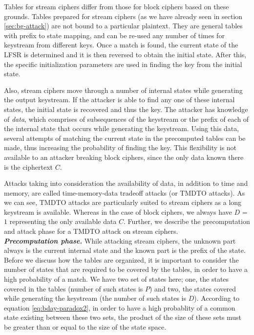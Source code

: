 Tables for stream ciphers differ from those for block ciphers based on these grounds. Tables prepared for stream ciphers (as we have already seen in section \ref{sec:bg-attack}) are not bound to a particular plaintext. They are general tables with prefix to state mapping, and can be re-used any number of times for keystream from different keys. Once a match is found, the current state of the LFSR is determined and it is then reversed to obtain the initial state. After this, the specific initialization parameters are used in finding the key from the initial state.

Also, stream ciphers move through a number of internal states while generating the output keystream. If the attacker is able to find any one of these internal states, the initial state is recovered and thus the key. The attacker has knowledge of \emph{data}, which comprises of subsequences of the keystream or the prefix of each of the internal state that occurs while generating the keystream. Using this data, several attempts of matching the current state in the precomputed tables can be made, thus increasing the probability of finding the key. This flexibility is not available to an attacker breaking block ciphers, since the only data known there is the ciphertext $C$. 

Attacks taking into consideration the availability of data, in addition to time and memory, are called time-memory-data tradeoff attacks (or TMDTO attacks). As we can see, TMDTO attacks are particularly suited to stream ciphers as a long keystream is available. Whereas in the case of block ciphers, we always have $D$ = $1$ representing the only available data $C$. Further, we describe the precomputation and attack phase for a TMDTO attack on stream ciphers.\\

\noindent \textit{\textbf{Precomputation phase.}} While attacking stream ciphers, the unknown part always is the current internal state and the known part is the prefix of the state. Before we discuss how the tables are organized, it is important to consider the number of states that are required to be covered by the tables, in order to have a high probability of a match. We have two set of states here; one, the states covered in the tables (number of such states is $P$) and two, the states covered while generating the keystream (the number of such states is $D$). According to equation \ref{eq:bday-paradox2}, in order to have a high probablity of a common state existing between these two sets, the product of the size of these sets must be greater than or equal to the size of the state space. 

